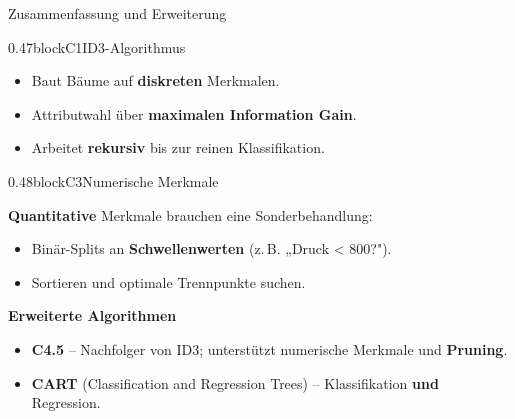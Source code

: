 \begin{frame}{Zusammenfassung und Erweiterung}
\begin{blockrow}
\begin{blockcol}{0.47\textwidth}{blockC1}{ID3-Algorithmus}

\begin{itemize}
  \item Baut Bäume auf \textbf{diskreten} Merkmalen.
  \item Attributwahl über \textbf{maximalen Information Gain}.
  \item Arbeitet \textbf{rekursiv} bis zur reinen Klassifikation.
\end{itemize}
\end{blockcol}

\begin{blockcol}{0.48\textwidth}{blockC3}{Numerische Merkmale}

\textbf{Quantitative} Merkmale brauchen eine Sonderbehandlung:
\begin{itemize}
  \item Binär-Splits an \textbf{Schwellenwerten} (z.\,B. „Druck < 800?").
  \item Sortieren und optimale Trennpunkte suchen.
\end{itemize}
\end{blockcol}
\end{blockrow}

\vspace{0.4em}

\textbf{Erweiterte Algorithmen}
\begin{itemize}
  \item \textbf{C4.5} -- Nachfolger von ID3; unterstützt numerische Merkmale
        und \textbf{Pruning}.
  \item \textbf{CART} (Classification and Regression Trees) -- Klassifikation
        \textbf{und} Regression.
\end{itemize}
\end{frame}


